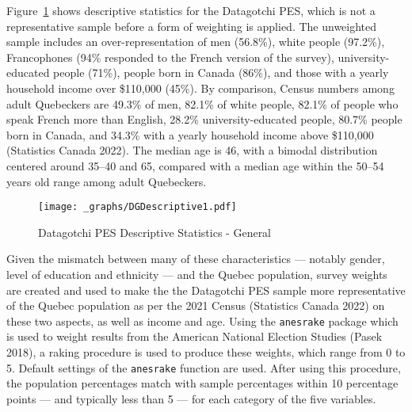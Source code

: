 \documentclass[
  letterpaper,
  DIV=11,
  numbers=noendperiod]{scrreprt}
\begin{document}
Figure~\ref{fig-dg} shows descriptive statistics for the Datagotchi PES,
which is not a representative sample before a form of weighting is
applied. The unweighted sample includes an over-representation of men
(56.8\%), white people (97.2\%), Francophones (94\% responded to the
French version of the survey), university-educated people (71\%), people
born in Canada (86\%), and those with a yearly household income over
\$110,000 (45\%). By comparison, Census numbers among adult Quebeckers
are 49.3\% of men, 82.1\% of white people, 82.1\% of people who speak
French more than English, 28.2\% university-educated people, 80.7\%
people born in Canada, and 34.3\% with a yearly household income above
\$110,000 (Statistics Canada 2022). The median age is 46, with a bimodal
distribution centered around 35--40 and 65, compared with a median age
within the 50--54 years old range among adult Quebeckers.

\begin{figure}

{\centering \texttt{[image: \_graphs/DGDescriptive1.pdf]}

}

\caption{\label{fig-dg}Datagotchi PES Descriptive Statistics - General}

\end{figure}

Given the mismatch between many of these characteristics --- notably
gender, level of education and ethnicity --- and the Quebec population,
survey weights are created and used to make the the Datagotchi PES
sample more representative of the Quebec population as per the 2021
Census (Statistics Canada 2022) on these two aspects, as well as income
and age. Using the \texttt{anesrake} package which is used to weight
results from the American National Election Studies (Pasek 2018), a
raking procedure is used to produce these weights, which range from 0 to
5. Default settings of the \texttt{anesrake} function are used. After
using this procedure, the population percentages match with sample
percentages within 10 percentage points --- and typically less than 5
--- for each category of the five variables.
\end{document}
